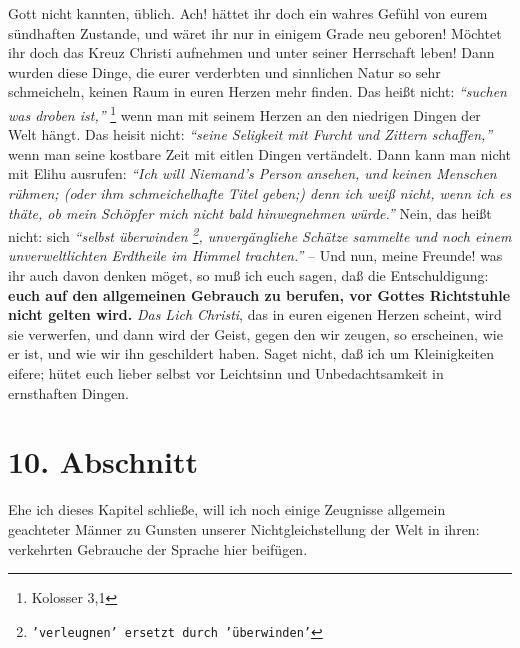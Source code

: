 Gott nicht kannten, üblich. Ach! hättet ihr doch ein wahres Gefühl von eurem
sündhaften Zustande, und wäret ihr nur in einigem Grade neu geboren! Möchtet ihr
doch das Kreuz Christi aufnehmen und unter seiner Herrschaft leben! Dann wurden
diese Dinge, die eurer verderbten und sinnlichen Natur so sehr schmeicheln,
keinen Raum in euren Herzen mehr finden. Das heißt nicht:
\textit{"`suchen was droben ist,"'}
\footnote{Kolosser 3,1}
wenn man mit seinem Herzen an den niedrigen Dingen der Welt hängt. Das
heisit nicht:
\textit{"`seine Seligkeit mit Furcht und Zittern schaffen,"'} wenn man
seine kostbare Zeit mit eitlen Dingen vertändelt. Dann kann man nicht mit Elihu
ausrufen:
\textit{"`Ich will Niemand's Person ansehen, und keinen Menschen rühmen; (oder
ihm schmeichelhafte Titel geben;) denn ich weiß nicht, wenn ich es thäte, ob
mein Schöpfer mich nicht bald hinwegnehmen würde."'}
Nein, das heißt nicht: sich
\textit{"`selbst überwinden
\footnote{\texttt{'verleugnen' ersetzt durch 'überwinden'}}, unvergängliehe Schätze sammelte und noch einem
unverweltlichten Erdtheile im Himmel trachten."'} -- Und nun, meine Freunde! was
ihr auch davon denken möget, so muß ich euch sagen, daß die Entschuldigung: \textbf{euch
auf den allgemeinen Gebrauch zu berufen, vor Gottes Richtstuhle nicht gelten
wird.} \textit{Das Lich Christi}, das in euren eigenen Herzen scheint, wird sie
verwerfen, und dann wird der Geist, gegen den wir zeugen, so erscheinen, wie er
ist, und wie wir ihn geschildert haben. Saget nicht, daß ich um Kleinigkeiten
eifere; hütet euch lieber selbst vor Leichtsinn und Unbedachtsamkeit in
ernsthaften Dingen.

\section{10. Abschnitt} \label{kap10_ab10}

Ehe ich dieses Kapitel schließe, will ich noch einige Zeugnisse allgemein
geachteter Männer zu Gunsten unserer Nichtgleichstellung der Welt in ihren:
verkehrten Gebrauche der Sprache hier beifügen.

\medskip

